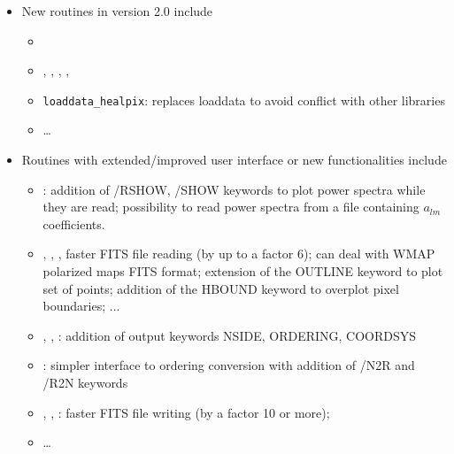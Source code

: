 \documentclass[12pt,twoside]{article}
\begin{document}
{{\begin{itemize}
\item New routines in version 2.0 include
\begin{itemize}
 \item {}
 \item {},
  , 
  ,
  , 
 \item {\tt loaddata\_healpix}: replaces loaddata to avoid conflict with other
  libraries
 \item \ldots
\end{itemize}

\item Routines with extended/improved user interface or new functionalities include
\begin{itemize}
\item {}: addition of /RSHOW, /SHOW keywords to plot
  power spectra while they are read; possibility to read power spectra from a
file containing $a_{lm}$ coefficients.
\item {}, ,
  , 
  faster FITS file reading (by up to a factor 6);
  can deal with WMAP polarized maps FITS format; extension
  of the OUTLINE keyword to plot set of points; addition of the HBOUND keyword
  to overplot pixel boundaries; ...
\item {},
  ,
  : 
   addition of output keywords   NSIDE, ORDERING, COORDSYS
\item {}: simpler interface to ordering
  conversion with addition of /N2R and /R2N keywords
\item {},
,
	: faster FITS file writing
(by a factor 10 or more);
\item \ldots
\end{itemize}
\end{itemize}
}} %
\end{document}
